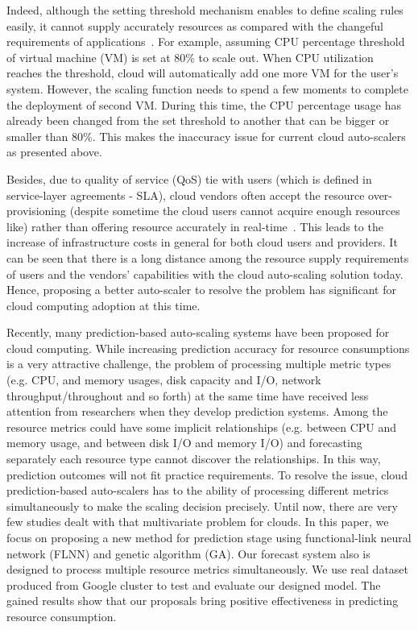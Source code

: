 \documentclass[conference]{IEEEtran}
\begin{document}
Indeed, although the setting threshold mechanism enables to define scaling rules easily, it cannot supply accurately resources as compared with the changeful requirements of applications~\cite{ref_cluser}. For example, assuming CPU percentage threshold of virtual machine (VM) is set at 80\% to scale out. When CPU utilization reaches the threshold, cloud will automatically add one more VM for the user’s system. However, the scaling function needs to spend a few moments to complete the deployment of second VM. During this time, the CPU percentage usage has already been changed from the set threshold to another that can be bigger or smaller than 80\%. This makes the inaccuracy issue for current cloud auto-scalers as presented above.

Besides, due to quality of service (QoS) tie with users (which is defined in service-layer agreements - SLA), cloud vendors often accept the resource over-provisioning (despite sometime the cloud users cannot acquire enough resources like) rather than offering resource accurately in real-time~\cite{ref_hpc}. This leads to the increase of infrastructure costs in general for both cloud users and providers. It can be seen that there is a long distance among the resource supply requirements of users and the vendors' capabilities with the cloud auto-scaling solution today. Hence, proposing a better auto-scaler to resolve the problem has significant for cloud computing adoption at this time.

Recently, many prediction-based auto-scaling systems have been proposed for cloud computing. While increasing prediction accuracy for resource consumptions is a very attractive challenge, the problem of processing multiple metric types (e.g. CPU, and memory usages, disk capacity and I/O, network throughput/throughout and so forth) at the same time have received less attention from researchers when they develop prediction systems. Among the resource metrics could have some implicit relationships (e.g. between CPU and memory usage, and between disk I/O and memory I/O) and forecasting separately each resource type cannot discover the relationships. In this way, prediction outcomes will not fit practice requirements. To resolve the issue, cloud prediction-based auto-scalers has to the ability of processing different metrics simultaneously to make the scaling decision precisely. Until now, there are very few studies dealt with that multivariate problem for clouds. In this paper, we focus on proposing a new method for prediction stage using functional-link neural network (FLNN) and genetic algorithm (GA). Our forecast system also is designed to process multiple resource metrics simultaneously. We use real dataset produced from Google cluster to test and evaluate our designed model. The gained results show that our proposals bring positive effectiveness in predicting resource consumption.
\end{document}
